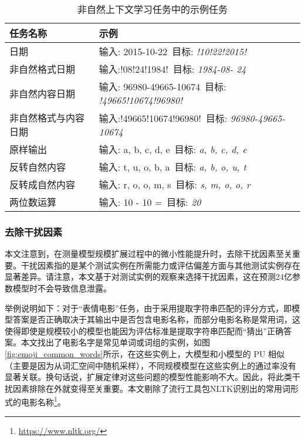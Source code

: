 \begin{table}[!htbp]
    \centering
    \label{tab:unnaturalicl}
    \caption{非自然上下文学习任务中的示例任务}
    \begin{tabular}{p{4cm}l}
        \toprule
        \textbf{任务名称}  & \textbf{示例} \\
        \midrule
        日期  & 输入: 2015-10-22\ 目标: \textit{!10!22!2015!}\\
        非自然格式日期  & 输入:!08!24!1984!\ 目标: \textit{1984-08- 24}\\
        非自然内容日期  & 输入: 96980-49665-10674\ 目标: \textit{!49665!10674!96980!}\\
        非自然格式与内容日期  & 输入:!49665!10674!96980!\ 目标: \textit{96980-49665-10674}\\
        原样输出  & 输入: a, b, c, d, e\ 目标: \textit{a, b, c, d, e} \\
        反转自然内容  & 输入: t, u, o, b, a\ 目标: \textit{a, b, o, u, t} \\
        反转成自然内容  & 输入: r, o, o, m, s\ 目标: \textit{s, m, o, o, r}  \\
        两位数运算  & 输入: 10 - 10 =\ 目标: \textit{20}\\
        \bottomrule
    \end{tabular}
    \label{tab:unnaturalincontextexample}
\end{table}



\subsubsection{去除干扰因素}
\label{app:removing_distracting}
本文注意到，在测量模型规模扩展过程中的微小性能提升时，去除干扰因素至关重要。干扰因素指的是某个测试实例在所需能力或评估偏差方面与其他测试实例存在显著差异。请注意，本文基于对测试实例的观察来选择干扰因素，这在预测24亿参数模型时不会导致信息泄露。

举例说明如下：对于“表情电影”任务，由于采用提取字符串匹配的评分方式，即模型答案是否正确取决于其输出中是否包含电影名称，而部分电影名称是常用词，这使得即使是规模较小的模型也能因为评估标准是提取字符串匹配而“猜出”正确答案。本文找出了电影名字是常见单词或词组的实例，如图\ref{fig:emoji_common_words}所示，在这些实例上，大模型和小模型的 \textsc{PU} 相似（主要是因为从词汇空间中随机采样），不同规模模型在这些实例上的通过率没有显著关联。换句话说，扩展定律对这些问题的模型性能影响不大。因此，将此类干扰因素排除在外就变得至关重要。本文剔除了流行工具包NLTK识别出的常用词形式的电影名称\footnote{\url{https://www.nltk.org/}}。

